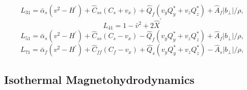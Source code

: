 \begin{equation}
L_{31} = \bar{\alpha}_{s}(v^{2} - H^{\prime}) + \hat{C}_{ss}(C_{s}+v_{x})
+ \hat{Q}_{f}(v_{y}Q_{y}^{\ast} + v_{z}Q_{z}^{\ast})
+ \hat{A}_{f}|b_{\perp}|/\rho,
\end{equation}
\begin{equation}
L_{41} = 1 - \bar{v}^{2} + 2\hat{X}^{\prime}
\end{equation}
\begin{equation}
L_{51} = \bar{\alpha}_{s}(v^{2} - H^{\prime}) + \hat{C}_{ss}(C_{s}-v_{x})
- \hat{Q}_{f}(v_{y}Q_{y}^{\ast} + v_{z}Q_{z}^{\ast})
+ \hat{A}_{f}|b_{\perp}|/\rho,
\end{equation}
\begin{equation}
L_{71} = \bar{\alpha}_{f}(v^{2} - H^{\prime}) + \hat{C}_{ff}(C_{f}-v_{x})
+ \hat{Q}_{s}(v_{y}Q_{y}^{\ast} + v_{z}Q_{z}^{\ast})
- \hat{A}_{s}|b_{\perp}|/\rho,
\end{equation}

\subsection{Isothermal Magnetohydrodynamics}

